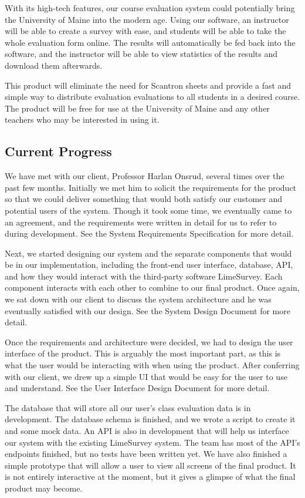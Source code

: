 \documentclass{article}
\begin{document}
With its high-tech features, our course evaluation system could potentially bring the University of Maine into the modern age. Using our software, an instructor will be able to create a survey with ease, and students will be able to take the whole evaluation form online. The results will automatically be fed back into the software, and the instructor will be able to view statistics of the results and download them afterwards.

This product will eliminate the need for Scantron sheets and provide a fast and simple way to distribute evaluation evaluations to all students in a desired course. The product will be free for use at the University of Maine and any other teachers who may be interested in using it.

\subsection{Current Progress}

We have met with our client, Professor Harlan Onsrud, several times over the past few months. Initially we met him to solicit the requirements for the product so that we could deliver something that would both satisfy our customer and potential users of the system. Though it took some time, we eventually came to an agreement, and the requirements were written in detail for us to refer to during development. See the System Requirements Specification for more detail.
	
Next, we started designing our system and the separate components that would be in our implementation, including the front-end user interface, database, API, and how they would interact with the third-party software LimeSurvey. Each component interacts with each other to combine to our final product. Once again, we sat down with our client to discuss the system architecture and he was eventually satisfied with our design. See the System Design Document for more detail.

Once the requirements and architecture were decided, we had to design the user interface of the product. This is arguably the most important part, as this is what the user would be interacting with when using the product. After conferring with our client, we drew up a simple UI that would be easy for the user to use and understand. See the User Interface Design Document for more detail.

The database that will store all our user's class evaluation data is in development. The database schema is finished, and we wrote a script to create it and some mock data. An API is also in development that will help us interface our system with the existing LimeSurvey system. The team has most of the API's endpoints finished, but no tests have been written yet. We have also finished a simple prototype that will allow a user to view all screens of the final product. It is not entirely interactive at the moment, but it gives a glimpse of what the final product may become.
\end{document}
